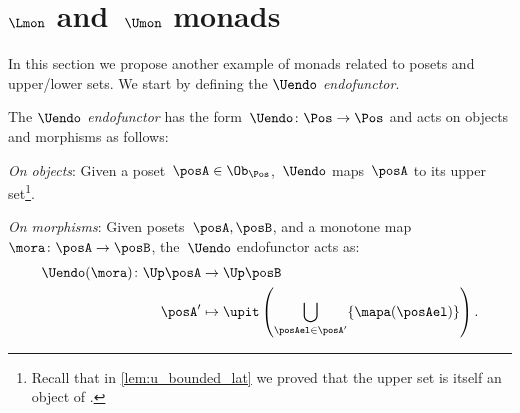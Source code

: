 %
%


\section{$\Lmon$ and~$\Umon$ monads}
In this section we propose another example of monads related to posets and upper/lower sets. We start by defining the \emph{$\Uendo$ endofunctor}.
\begin{definition}
    \label{def:Uendo}
    The \emph{$\Uendo$ endofunctor} has the form~$\Uendo \colon \Pos \to \Pos$ and acts on objects and morphisms as follows:
    \begin{compactenum}
        \item \emph{On objects}: Given a poset~$\posA \in \Ob_\Pos$,~$\Uendo$ maps~$\posA$ to its upper set\footnote{Recall that in \cref{lem:u_bounded_lat} we proved that the upper set is itself an object of \Pos.}.
        \item \emph{On morphisms}: Given posets~$\posA,\posB$, and a monotone map~$\mora \colon \posA\to \posB$, the~$\Uendo$ endofunctor acts as:
        \begin{equation}
            \begin{aligned}
                \Uendo(\mora)\colon \Up \posA&\to \Up \posB\\
                \posA'&\mapsto \upit \left( \bigcup_{\posAel\in \posA'} \{\mapa(\posAel)\}\right).
            \end{aligned}
        \end{equation}
    \end{compactenum}
\end{definition}

